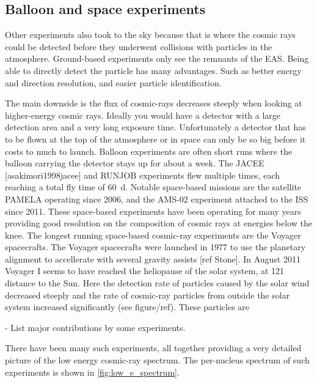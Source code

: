\subsection{Balloon and space experiments}

Other experiments also took to the sky because that is where the cosmic rays could be detected before they underwent collisions with particles in the atmosphere. Ground-based experiments only see the remnants of the EAS. Being able to directly detect the particle has many advantages. Such as better energy and direction resolution, and easier particle identification.

The main downside is the flux of cosmic-rays decreases steeply when looking at higher-energy cosmic rays. Ideally you would have a detector with a large detection area and a very long exposure time. Unfortunately a detector that has to be flown at the top of the atmosphere or in space can only be so big before it costs to much to launch. Balloon experiments are often short runs where the balloon carrying the detector stays up for about a week. The JACEE [asakimori1998jacee] and RUNJOB experiments flew multiple times, each reaching a total fly time of \SI{60}{\day}. Notable space-based missions are the satellite PAMELA operating since 2006, and the AMS-02 experiment attached to the ISS since 2011. These space-based experiments have been operating for many years providing good resolution on the composition of cosmic rays at energies below the knee. The longest running space-based cosmic-ray experiments are the Voyager spacecrafts. The Voyager spacecrafts were launched in 1977 to use the planetary alignment to accellerate with several gravity assists [ref Stone]. In August 2011 Voyager I seems to have reached the heliopause of the solar system, at \SI{121}{\AU} distance to the Sun. Here the detection rate of particles caused by the solar wind decreased steeply and the rate of cosmic-ray particles from outside the solar system increased significantly (see figure/ref). These particles are 

- List major contributions by some experiments.

There have been many such experiments, all together providing a very detailed picture of the low energy cosmic-ray spectrum. The per-nucleus spectrum of such experiments is shown in \cref{fig:low_e_spectrum}.

